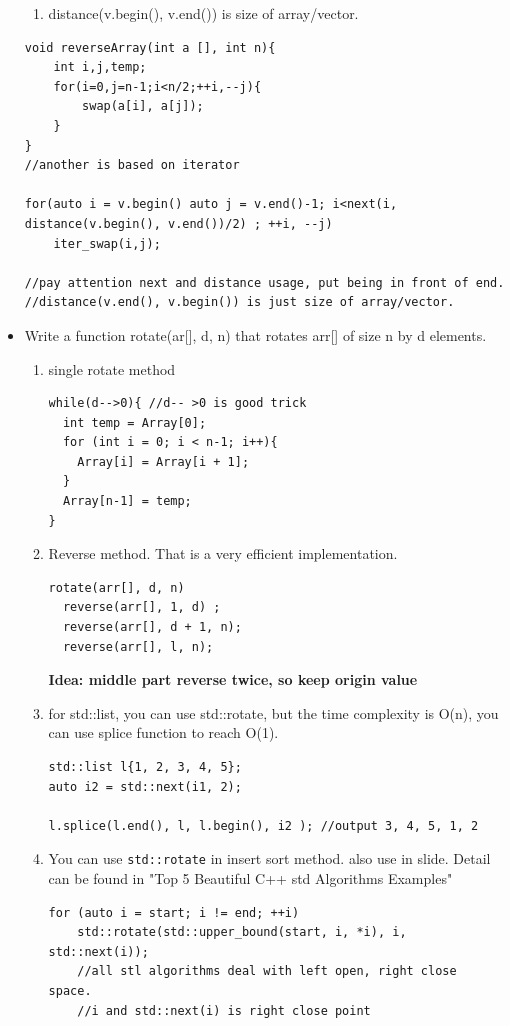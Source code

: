 \documentclass[a4paper,11pt,twoside]{book}
\begin{document}
\begin{itemize}
\begin{enumerate}
		\item distance(v.begin(), v.end()) is size of array/vector. 
	\end{enumerate}
	
\begin{lstlisting}[breaklines]
void reverseArray(int a [], int n){
	int i,j,temp;
	for(i=0,j=n-1;i<n/2;++i,--j){
		swap(a[i], a[j]);
	}
}
//another is based on iterator

for(auto i = v.begin() auto j = v.end()-1; i<next(i, distance(v.begin(), v.end())/2) ; ++i, --j)
	iter_swap(i,j);

//pay attention next and distance usage, put being in front of end.
//distance(v.end(), v.begin()) is just size of array/vector. 
\end{lstlisting}

	\item Write a function rotate(ar[], d, n) that rotates arr[] of size n by d elements.
\begin{enumerate}
	\item single rotate method
\begin{lstlisting}[breaklines]
while(d-->0){ //d-- >0 is good trick
  int temp = Array[0];
  for (int i = 0; i < n-1; i++){
    Array[i] = Array[i + 1];
  }
  Array[n-1] = temp;
}
\end{lstlisting}

	\item Reverse method. That is a very efficient implementation.
\begin{lstlisting}[breaklines]
rotate(arr[], d, n)
  reverse(arr[], 1, d) ;
  reverse(arr[], d + 1, n);
  reverse(arr[], l, n);
\end{lstlisting}
\textbf{Idea: middle part reverse twice, so keep origin value}

	\item for std::list, you can use std::rotate, but the time complexity is O(n), you can use splice function to reach O(1).  
\begin{lstlisting}
std::list l{1, 2, 3, 4, 5};
auto i2 = std::next(i1, 2);

l.splice(l.end(), l, l.begin(), i2 ); //output 3, 4, 5, 1, 2
\end{lstlisting}


	\item You can use \texttt{std::rotate} in insert sort method. also use in slide. Detail can be found in "Top 5 Beautiful C++ std Algorithms Examples"
\begin{lstlisting}[breaklines, basicstyle=\scriptsize]
for (auto i = start; i != end; ++i)
	std::rotate(std::upper_bound(start, i, *i), i, std::next(i));  
	//all stl algorithms deal with left open, right close space. 
	//i and std::next(i) is right close point                               


\end{lstlisting}
\end{enumerate}
\end{itemize}
\end{document}
